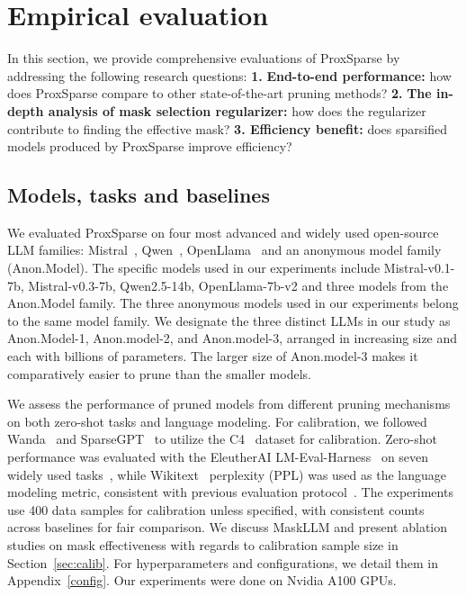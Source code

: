 \section{Empirical evaluation}

\label{sec:evaluation}

In this section, we provide comprehensive evaluations of ProxSparse by addressing the following research questions: \textbf{1.} \textbf{End-to-end performance:} how does ProxSparse compare to other state-of-the-art pruning methods? \textbf{2.} \textbf{The in-depth analysis of mask selection regularizer:} how does the regularizer contribute to finding the effective mask? 
\textbf{3. Efficiency benefit:} does sparsified models produced by ProxSparse improve efficiency?

\subsection{Models, tasks and baselines}
\label{sec:model}
We evaluated ProxSparse on four most advanced and widely used open-source LLM families: Mistral~\cite{jiang2023mistral}, Qwen~\cite{yang2024qwen2}, OpenLlama~\cite{openlm2023openllama} and an anonymous model family (Anon.Model). The specific models used in our experiments include Mistral-v0.1-7b, Mistral-v0.3-7b, Qwen2.5-14b, OpenLlama-7b-v2 and three models from the Anon.Model family. 
The three anonymous models used in our experiments belong to the same model family. We designate the three distinct LLMs in our study as Anon.Model-1, Anon.model-2, and Anon.model-3, arranged in increasing size and each with billions of parameters. The larger size of Anon.model-3 makes it comparatively easier to prune than the smaller models.

We assess the performance of pruned models from different pruning mechanisms on both zero-shot tasks and language modeling. For calibration, we followed Wanda~\cite{sun2023simple} and SparseGPT~\cite{frantar2023sparsegpt} to utilize the C4~\cite{raffel2020exploring} dataset for calibration. Zero-shot performance was evaluated with the EleutherAI LM-Eval-Harness~\cite{eval-harness} on seven widely used tasks~\cite{liu2024dora}, while Wikitext~\cite{merity2016pointer} perplexity (PPL) was used as the language modeling metric, consistent with previous evaluation protocol~\cite{sun2023simple, frantar2023sparsegpt}. The experiments use 400 data samples for calibration unless specified, with consistent counts across baselines for fair comparison. We discuss MaskLLM and present ablation studies on mask effectiveness with regards to calibration sample size in Section~\ref{sec:calib}. For hyperparameters and configurations, we detail them in Appendix~\ref{config}. Our experiments were done on Nvidia A100 GPUs.

